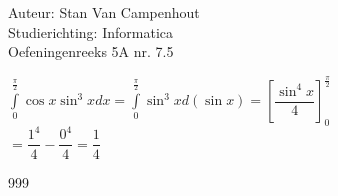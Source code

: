 \documentclass[a4paper]{article}
\begin{document}
  
\noindent \large Auteur: Stan Van Campenhout \\
\noindent \large Studierichting:  Informatica\\
\noindent \large Oefeningenreeks 5A nr. 7.5\\

\medskip

\normalsize

$ \displaystyle\int\limits_0^{\tfrac{\pi}{2}}\cos x\sin^3xdx = \displaystyle\int\limits_0^{\tfrac{\pi}{2}}\sin^3xd\left(\sin x\right)  = \left[\dfrac{\sin^4x}{4}\right]_0^{\tfrac{\pi}{2}} $\\

$ = \dfrac{1^4}{4} - \dfrac{0^4}{4} = \dfrac{1}{4} $\\

\begin{thebibliography}{999}
\end{thebibliography}
\end{document}
